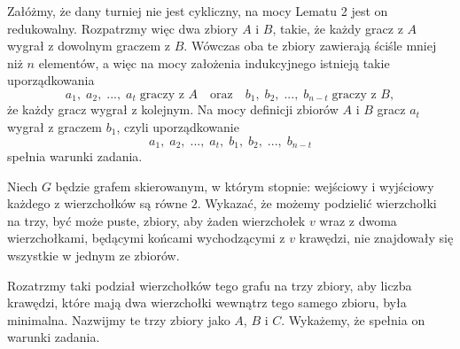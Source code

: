 \vspace{10px}
\noindent
Załóżmy, że dany turniej nie jest cykliczny, na mocy Lematu 2 jest on redukowalny. Rozpatrzmy więc dwa zbiory $A$ i $B$, takie, że każdy gracz z $A$ wygrał z dowolnym graczem z $B$. Wówczas oba te zbiory zawierają ściśle mniej niż $n$ elementów, a więc na mocy założenia indukcyjnego istnieją takie uporządkowania
\[
	a_1, \; a_2, \; ..., \; a_t \; \text{graczy z } A 
	\quad
	\text{oraz}
	\quad
	b_1, \; b_2, \; ..., \; b_{n - t} \; \text{graczy z } B, 
\]
że każdy gracz wygrał z kolejnym. Na mocy definicji zbiorów $A$ i $B$ gracz $a_t$ wygrał z graczem $b_1$, czyli uporządkowanie
\[
	a_1, \; a_2, \; ..., \; a_t , \; b_1, \; b_2, \; ..., \; b_{n - t}
\]
spełnia warunki zadania.

\begin{problem}{3}
	Niech $G$ będzie grafem skierowanym, w którym stopnie: wejściowy i wyjściowy każdego z wierzchołków są równe $2$. Wykazać, że możemy podzielić wierzchołki na trzy, być może puste, zbiory, aby żaden wierzchołek $v$ wraz z dwoma wierzchołkami, będącymi końcami wychodzącymi z $v$ krawędzi, nie znajdowały się wszystkie w jednym ze zbiorów.
\end{problem}

\noindent
Rozatrzmy taki podział wierzchołków tego grafu na trzy zbiory, aby liczba krawędzi, które mają dwa wierzchołki wewnątrz tego samego zbioru, była minimalna. Nazwijmy te trzy zbiory jako $A$, $B$ i $C$. Wykażemy, że spełnia on warunki zadania.

\begin{center}
\end{center}

